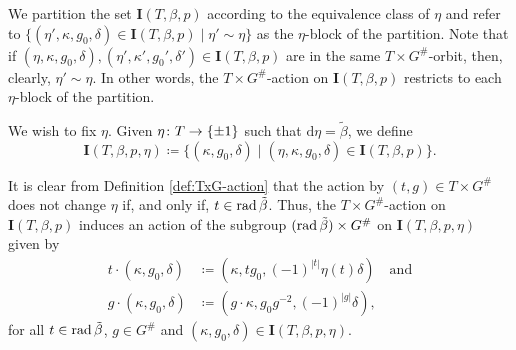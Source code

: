 We partition the set $\mathbf{I}(T, \beta, p)$ according to the equivalence class of $\eta$ and refer to $\{ (\eta', \kappa, g_0, \delta) \in \mathbf{I}(T, \beta, p) \mid \eta' \sim \eta \}$ as the $\eta$-block of the partition.
Note that if $(\eta, \kappa, g_0, \delta), (\eta', \kappa', g_0', \delta') \in \mathbf{I}(T, \beta, p)$ are in the same $T\times G^\#$-orbit, then, clearly, $\eta' \sim \eta$.
In other words, the $T\times G^\#$-action on $\mathbf{I}(T, \beta, p)$ restricts to each $\eta$-block of the partition.

We wish to fix $\eta$.
Given $\eta\colon T \to \{ \pm 1 \}$ such that $\mathrm{d}\eta = \tilde\beta$,
we define
\[
	\mathbf{I}(T, \beta, p, \eta) \coloneqq \{ (\kappa, g_0, \delta) \mid (\eta, \kappa, g_0, \delta) \in \mathbf{I}(T, \beta, p)\}.
\]






It is clear from Definition \ref{def:TxG-action} that the action by $(t,g)\in T\times G^\#$ does not change $\eta$ if, and only if, $t\in \operatorname{rad} \tilde\beta$.
Thus, the $T\times G^\#$-action on $\mathbf{I}(T, \beta, p)$ induces an action of the subgroup $(\operatorname{rad} \tilde\beta) \times G^\#$ on $\mathbf{I}(T, \beta, p, \eta)$ given by
\begin{align}
	t \cdot (\kappa, g_0, \delta) & \coloneqq (\kappa, t g_0, (-1)^{|t|} \eta(t)\delta)
	\quad \text{and}                                                                          \\
	g \cdot (\kappa, g_0, \delta) & \coloneqq (g\cdot \kappa, g_0 g^{-2}, (-1)^{|g|} \delta),
\end{align}
for all $t\in \operatorname{rad} \tilde\beta$, $g\in G^\#$ and $(\kappa, g_0, \delta) \in \mathbf{I}(T, \beta, p, \eta)$.

